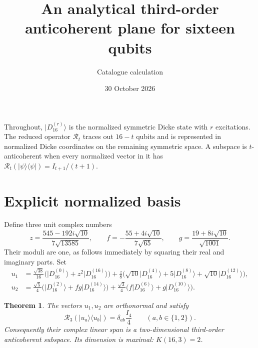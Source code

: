 \documentclass[11pt]{article}
\title{An analytical third-order anticoherent plane for sixteen qubits}
\author{Catalogue calculation}
\date{30 October 2026}
\newtheorem{theorem}{Theorem}
\newcommand{\D}[1]{\lvert D_{16}^{(#1)}\rangle}
\newcommand{\R}{\mathcal R}
\begin{document}
\maketitle
Throughout, $\D r$ is the normalized symmetric Dicke state with $r$ excitations.
The reduced operator $\R_t$ traces out $16-t$ qubits and is represented in
normalized Dicke coordinates on the remaining symmetric space.
A subspace is $t$-anticoherent when every normalized vector in it has
$\R_t(\lvert\psi\rangle\langle\psi\rvert)=I_{t+1}/(t+1)$.

\section{Explicit normalized basis}
Define three unit complex numbers
\begin{equation}\label{eq:phases}
z=\frac{545-192i\sqrt{10}}{7\sqrt{13585}},\qquad
f=-\frac{55+4i\sqrt{10}}{7\sqrt{65}},\qquad
g=\frac{19+8i\sqrt{10}}{\sqrt{1001}}.
\end{equation}
Their moduli are one, as follows immediately by squaring their real and
imaginary parts. Set
\begin{align}
u_1&=\frac{\sqrt{38}}{16}\bigl(\D0+z^2\D{16}\bigr)
 +\frac z8\bigl(\sqrt{10}\D4+5\D8+\sqrt{10}\D{12}\bigr),\label{eq:u1}\\
u_2&=\frac{\sqrt5}{4}\bigl(\D2+fg\D{14}\bigr)
 +\frac{\sqrt3}{4}\bigl(f\D6+g\D{10}\bigr).\label{eq:u2}
\end{align}
\begin{theorem}
The vectors $u_1,u_2$ are orthonormal and satisfy
\begin{equation}\label{eq:cross}
\R_3(\lvert u_a\rangle\langle u_b\rvert)=\delta_{ab}\frac{I_4}{4}
\qquad(a,b\in\{1,2\}).
\end{equation}
Consequently their complex linear span is a two-dimensional third-order
anticoherent subspace. Its dimension is maximal: $K(16,3)=2$.
\end{theorem}
\end{document}
